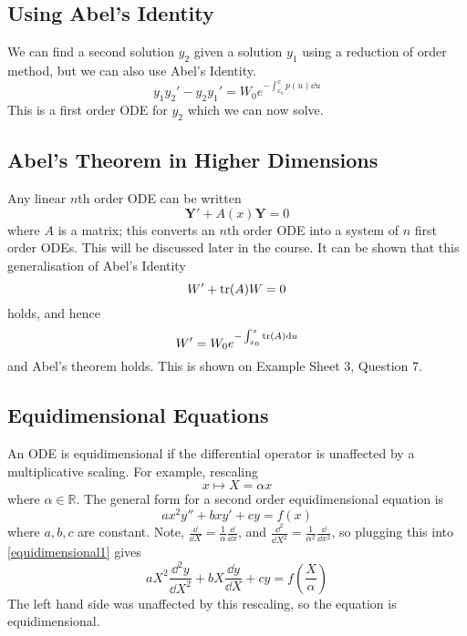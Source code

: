 \documentclass{article}
\begin{document}
\subsection{Using Abel's Identity}
We can find a second solution $y_2$ given a solution $y_1$ using a reduction of order method, but we can also use Abel's Identity.
\[ y_1y_2' - y_2y_1' = W_0 e^{-\int_{x_0}^x p(u) \dd u} \]
This is a first order ODE for $y_2$ which we can now solve.

\subsection{Abel's Theorem in Higher Dimensions}
Any linear $n$th order ODE can be written
\[\bm Y' + A(x) \bm Y = 0 \]
where $A$ is a matrix; this converts an $n$th order ODE into a system of $n$ first order ODEs. This will be discussed later in the course. It can be shown that this generalisation of Abel's Identity
\[ W' + \tr(A)W = 0 \]
holds, and hence
\[ W' = W_0e^{-\int_{x_0}^x \tr(A) \dd u} \]
and Abel's theorem holds. This is shown on Example Sheet 3, Question 7.

\subsection{Equidimensional Equations}
An ODE is equidimensional if the differential operator is unaffected by a multiplicative scaling. For example, rescaling
\[ x \mapsto X = \alpha x \]
where $\alpha \in \mathbb R$. The general form for a second order equidimensional equation is
\begin{equation}\label{equidimensional1}
	ax^2 y'' + bxy' + cy = f(x)
\end{equation}
where $a, b, c$ are constant. Note, $\frac{\dd}{\dd X} = \frac{1}{\alpha}\frac{\dd}{\dd x}$, and $\frac{\dd^2}{\dd X^2} = \frac{1}{\alpha^2}\frac{\dd}{\dd x^2}$, so plugging this into \eqref{equidimensional1} gives
\[ aX^2\frac{\dd^2 y}{\dd X^2} + bX\frac{\dd y}{\dd X} + cy = f\left(\frac{X}{\alpha}\right) \]
The left hand side was unaffected by this rescaling, so the equation is equidimensional.
\end{document}
